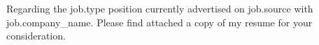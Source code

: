 Regarding the {{job.type}} position currently advertised on {{job.source}} with {{job.company_name}}. Please find attached a copy of my resume for your consideration.
